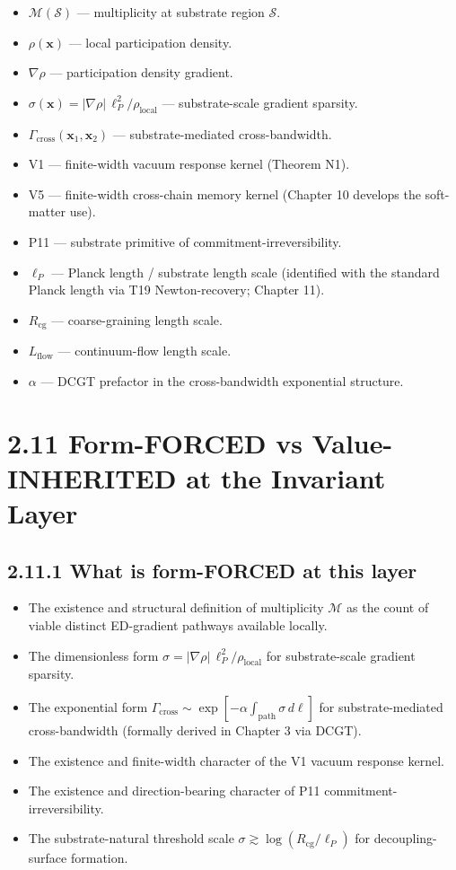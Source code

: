 \documentclass[11pt]{book}
\begin{document}
\begin{itemize}
\item $\mathcal{M}(\mathcal{S})$ — multiplicity at substrate region $\mathcal{S}$.
\item $\rho(\mathbf{x})$ — local participation density.
\item $\nabla\rho$ — participation density gradient.
\item $\sigma(\mathbf{x}) = |\nabla\rho|\,\ell_P^2/\rho_\mathrm{local}$ — substrate-scale gradient sparsity.
\item $\Gamma_\mathrm{cross}(\mathbf{x}_1, \mathbf{x}_2)$ — substrate-mediated cross-bandwidth.
\item V1 — finite-width vacuum response kernel (Theorem N1).
\item V5 — finite-width cross-chain memory kernel (Chapter 10 develops the soft-matter use).
\item P11 — substrate primitive of commitment-irreversibility.
\item $\ell_P$ — Planck length / substrate length scale (identified with the standard Planck length via T19 Newton-recovery; Chapter 11).
\item $R_\mathrm{cg}$ — coarse-graining length scale.
\item $L_\mathrm{flow}$ — continuum-flow length scale.
\item $\alpha$ — DCGT prefactor in the cross-bandwidth exponential structure.
\end{itemize}

\section{2.11 Form-FORCED vs Value-INHERITED at the Invariant Layer}

\subsection{2.11.1 What is form-FORCED at this layer}

\begin{itemize}
\item The existence and structural definition of multiplicity $\mathcal{M}$ as the count of viable distinct ED-gradient pathways available locally.
\item The dimensionless form $\sigma = |\nabla\rho|\,\ell_P^2/\rho_\mathrm{local}$ for substrate-scale gradient sparsity.
\item The exponential form $\Gamma_\mathrm{cross} \sim \exp[-\alpha\int_\mathrm{path}\sigma\,d\ell]$ for substrate-mediated cross-bandwidth (formally derived in Chapter 3 via DCGT).
\item The existence and finite-width character of the V1 vacuum response kernel.
\item The existence and direction-bearing character of P11 commitment-irreversibility.
\item The substrate-natural threshold scale $\sigma \gtrsim \log(R_\mathrm{cg}/\ell_P)$ for decoupling-surface formation.
\end{itemize}
\end{document}
